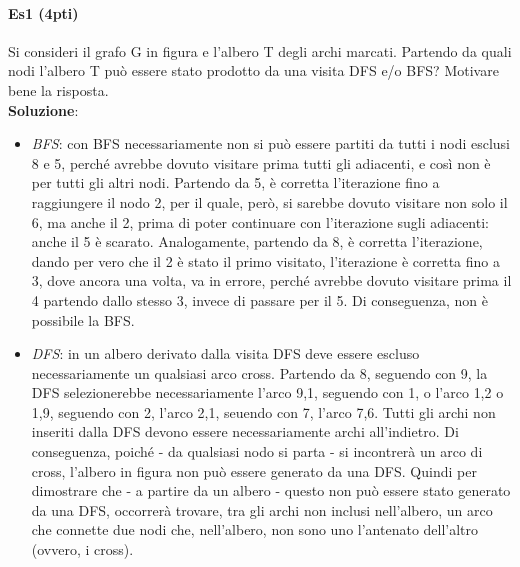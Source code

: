 \paragraph{Es1 (4pti)}
Si consideri il grafo G in figura e l'albero T degli archi marcati. Partendo da quali nodi l'albero T può essere stato prodotto da una visita DFS e/o BFS? Motivare bene la risposta. \\
\textbf{Soluzione}:
\begin{itemize}
	\item \textit{BFS}: con BFS necessariamente non si può essere partiti da tutti i nodi esclusi 8 e 5, perché avrebbe dovuto visitare prima tutti gli adiacenti, e così non è per tutti gli altri nodi. Partendo da 5, è corretta l'iterazione fino a raggiungere il nodo 2, per il quale, però, si sarebbe dovuto visitare non solo il 6, ma anche il 2, prima di poter continuare con l'iterazione sugli adiacenti: anche il 5 è scarato. Analogamente, partendo da 8, è corretta l'iterazione, dando per vero che il 2 è stato il primo visitato, l'iterazione è corretta fino a 3, dove ancora una volta, va in errore, perché avrebbe dovuto visitare prima il 4 partendo dallo stesso 3, invece di passare per il 5. Di conseguenza, non è possibile la BFS.
	\item \textit{DFS}: in un albero derivato dalla visita DFS deve essere escluso necessariamente un qualsiasi arco cross. Partendo da 8, seguendo con 9, la DFS selezionerebbe necessariamente l'arco {9,1}, seguendo con 1, o l'arco {1,2} o {1,9}, seguendo con 2, l'arco {2,1}, seuendo con 7, l'arco {7,6}. Tutti gli archi non inseriti dalla DFS devono essere necessariamente archi all'indietro. Di conseguenza, poiché - da qualsiasi nodo si parta - si incontrerà un arco di cross, l'albero in figura non può essere generato da una DFS. Quindi per dimostrare che - a partire da un albero - questo non può essere stato generato da una DFS, occorrerà trovare, tra gli archi non inclusi nell'albero, un arco che connette due nodi che, nell'albero, non sono uno l'antenato dell'altro (ovvero, i cross).
\end{itemize}
\newpage

